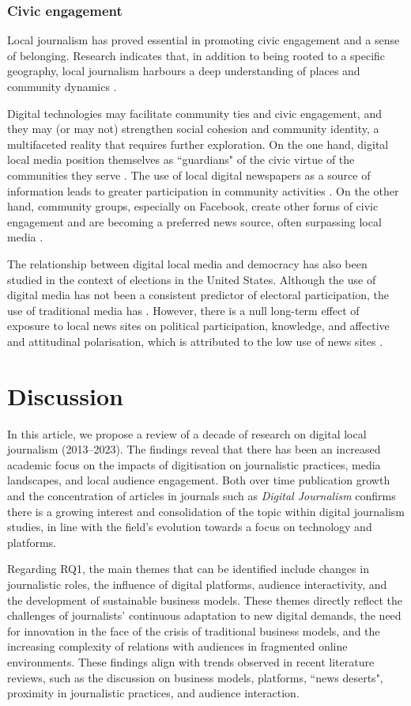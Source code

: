 \documentclass[english]{textolivre}
\begin{document}
\subsubsection{Civic engagement}
Local journalism has proved essential in promoting civic engagement and a sense of belonging. Research indicates that, in addition to being rooted to a specific geography, local journalism harbours a deep understanding of places and community dynamics \cite{hess2016}.

Digital technologies may facilitate community ties and civic engagement, and they may (or may not) strengthen social cohesion and community identity, a multifaceted reality that requires further exploration. On the one hand, digital local media position themselves as ``guardians" of the civic virtue of the communities they serve \cite{hess2016}. The use of local digital newspapers as a source of information leads to greater participation in community activities \cite{thompson2021}. On the other hand, community groups, especially on Facebook, create other forms of civic engagement and are becoming a preferred news source, often surpassing local media \cite{carlsson2016}.

The relationship between digital local media and democracy has also been studied in the context of elections in the United States. Although the use of digital media has not been a consistent predictor of electoral participation, the use of traditional media has \cite{min2022}. However, there is a null long-term effect of exposure to local news sites on political participation, knowledge, and affective and attitudinal polarisation, which is attributed to the low use of news sites \cite{cronin2023}.

\section{Discussion}
In this article, we propose a review of a decade of research on digital local journalism (2013–2023). The findings reveal that there has been an increased academic focus on the impacts of digitisation on journalistic practices, media landscapes, and local audience engagement. Both over time publication growth and the concentration of articles in journals such as \emph{Digital Journalism} confirms there is a growing interest and consolidation of the topic within digital journalism studies, in line with the field’s evolution towards a focus on technology and platforms.

 Regarding RQ1, the main themes that can be identified include changes in journalistic roles, the influence of digital platforms, audience interactivity, and the development of sustainable business models. These themes directly reflect the challenges of journalists’ continuous adaptation to new digital demands, the need for innovation in the face of the crisis of traditional business models, and the increasing complexity of relations with audiences in fragmented online environments. These findings align with trends observed in recent literature reviews, such as the discussion on business models, platforms, ``news deserts", proximity in journalistic practices, and audience interaction.
\end{document}
